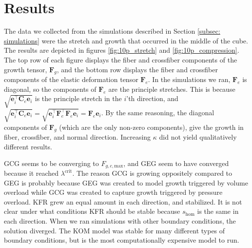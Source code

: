 \section{Results}
The data we collected from the simulations described in Section \ref{subsec: simulations} were the stretch and growth that occurred in the middle of the cube. The results are depicted in figures \ref{fig:10p_stretch} and \ref{fig:10p_compression}. The top row of each figure displays the fiber and crossfiber components of the growth tensor, $\mathbf{F}_g$, and the bottom row displays the fiber and crossfiber components of the elastic deformation tensor $\mathbf{F}_e$. In the simulations we ran, $\mathbf{F}_e$ is diagonal, so the components of $\mathbf{F}_e$ are the principle stretches. This is because $\sqrt{\mathbf{e}_i^\top\mathbf{C}_e\mathbf{e}_i}$ is the principle stretch in the $i$'th direction, and $\sqrt{\mathbf{e}_i^\top\mathbf{C}_e\mathbf{e}_i} = \sqrt{\mathbf{e}_i^\top\mathbf{F}_e^\top\mathbf{F}_e\mathbf{e}_i} = \mathbf{F}_e\mathbf{e}_i$. By the same reasoning, the diagonal components of $\mathbf{F}_g$ (which are the only non-zero components), give the growth in fiber, crossfiber, and normal direction. Increasing $\kappa$ did not yield qualitatively different results. \par
GCG seems to be converging to $F_{g,c,\mathrm{max}}$, and GEG seem to have converged because it reached $\lambda^\text{crit}$. The reason GCG is growing oppositely compared to GEG is probably because GEG was created to model growth triggered by volume overload while GCG was created to capture growth triggered by pressure overload. KFR grew an equal amount in each direction, and stabilized. It is not clear under what conditions KFR should be stable because $s_\mathrm{hom}$ is the same in each direction. When we ran simulations with other boundary conditions, the solution diverged. The KOM model was stable for many different types of boundary conditions, but is the most computationally expensive model to run.\par 
